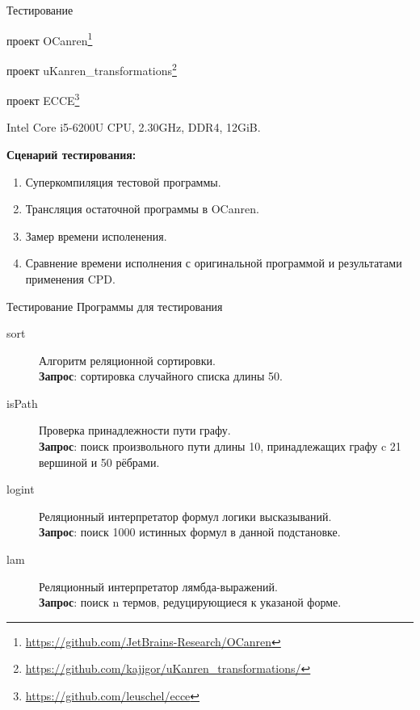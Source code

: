 \documentclass[xcolor=table]{beamer}
\begin{document}
%
\begin{frame}{Тестирование}

\begin{description}[leftmargin=!]
\item[Реализация miniKanren:] проект OCanren\footnote{\url{https://github.com/JetBrains-Research/OCanren}}\\
\item[Реализация CPD для miniKanren:] проект uKanren\_transformations\footnote{\url{https://github.com/kajigor/uKanren_transformations/}}
\item[Реализация CPD для Prolog:] проект ECCE\footnote{\url{https://github.com/leuschel/ecce}}
\item[Платформа:] Intel Core i5-6200U CPU, 2.30GHz, DDR4, 12GiB.
\end{description}
{\bf Сценарий тестирования:}
\begin{enumerate}
\item Суперкомпиляция тестовой программы.
\item Трансляция остаточной программы в OCanren.
\item Замер времени исполенения.
\item Сравнение времени исполнения с оригинальной программой и результатами
      применения CPD.
\end{enumerate}
\end{frame}
%
\begin{frame}{Тестирование}
{\small Программы для тестирования}
\begin{description}
\item[sort]Алгоритм реляционной сортировки.\\
      {\bf Запрос}: сортировка случайного списка длины 50.
\item[isPath] Проверка принадлежности пути графу.\\
      {\bf Запрос}: поиск  произвольного пути длины 10, принадлежащих графу c 21 вершиной и 50 рёбрами.
\item[logint] Реляционный интерпретатор формул логики высказываний.\\
      {\bf Запрос}: поиск 1000 истинных формул в данной подстановке.
\item[lam] Реляционный интерпретатор лямбда-выражений.\\
      {\bf Запрос}: поиск n термов, редуцирующиеся к указаной форме.
\end{description}
\end{frame}
\end{document}
